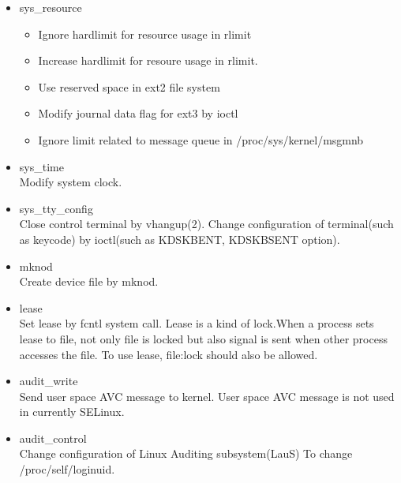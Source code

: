 \documentclass{article}
\begin{document}
\begin{itemize}
  \item sys\_resource\\
	  \begin{itemize}
	   \item Ignore hardlimit for resource usage in rlimit
	   \item Increase hardlimit for resoure usage in rlimit.
	   \item Use reserved space in ext2 file system
	   \item Modify journal data flag for ext3 by ioctl
	   \item Ignore limit related to message queue in
	  /proc/sys/kernel/msgmnb 	  
	  \end{itemize}
  \item sys\_time\\
	  Modify system clock.
  \item sys\_tty\_config\\
	  Close control terminal by vhangup(2). Change configuration of
	  terminal(such as keycode) by ioctl(such as KDSKBENT, KDSKBSENT option). 
  \item mknod\\
	  Create device file by mknod.
  \item lease\\
	  Set lease by fcntl system call. Lease is a kind of lock.When a
	  process sets lease to file, not only file is locked but also
	  signal is sent when other process accesses the file.
	  To use lease, file:lock should also be allowed.

  \item audit\_write\\
	  Send user space AVC message to kernel. User space AVC
	  message is not used in currently SELinux.
  \item audit\_control\\
	  Change configuration of Linux Auditing
	  subsystem(LauS)\cite{laus}
	  To change /proc/self/loginuid.
 \end{itemize}
      
\end{document}
